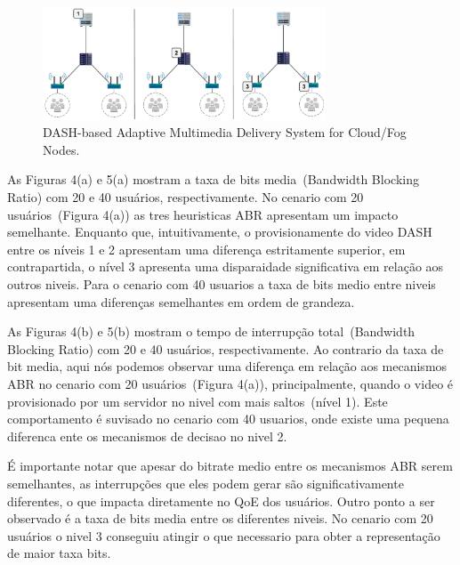 
\begin{figure}[htpb]
	\centering
	\includegraphics[width=0.75\textwidth]{img/exp-multi-lvl}
	\caption{DASH-based Adaptive Multimedia Delivery System for Cloud/Fog Nodes.}
	\label{fig:scenario-arch}
\end{figure}

As Figuras 4(a) e 5(a) mostram a taxa de bits media~(Bandwidth Blocking Ratio) com 20 e 40 usuários, respectivamente. No cenario com 20 usuários~(Figura 4(a)) as tres heuristicas ABR apresentam um impacto semelhante. Enquanto que, intuitivamente, o provisionamente do video DASH entre os níveis 1 e 2 apresentam uma diferença estritamente superior, em contrapartida, o nível 3 apresenta uma disparaidade significativa em relação aos outros niveis. Para o cenario com 40 usuarios a taxa de bits medio entre niveis apresentam uma diferenças semelhantes em ordem de grandeza. 

As Figuras 4(b) e 5(b) mostram o tempo de interrupção total~(Bandwidth Blocking Ratio) com 20 e 40 usuários, respectivamente. Ao contrario da taxa de bit media, aqui nós podemos observar uma diferença em relação aos mecanismos ABR no cenario com 20 usuários~(Figura 4(a)), principalmente, quando o video é provisionado por um servidor no nivel com mais saltos~(nível 1). Este comportamento é suvisado no cenario com 40 usuarios, onde existe uma pequena diferenca ente os mecanismos de decisao no nivel 2.


É importante notar que apesar do bitrate medio entre os mecanismos ABR serem semelhantes, as interrupções que eles podem gerar são significativamente diferentes, o que impacta diretamente no QoE dos usuários. Outro ponto a ser observado é a taxa de bits media entre os diferentes niveis. No cenario com 20 usuários o nivel 3 conseguiu atingir o que necessario para obter a representação de maior taxa bits.

